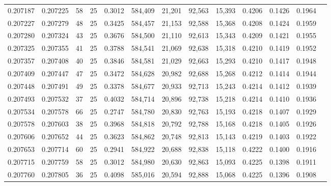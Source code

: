 \begin{tabular}{rrrrrrrrrrrrr}
0.207187 & 0.207225 &  58 &  25 &                                     0.3012 & 584,409 &  21,201 &  92,563 &  15,393 & 0.4206 & 0.1426 & 0.1964 \\
0.207227 & 0.207279 &  48 &  25 &                                     0.3425 & 584,457 &  21,153 &  92,588 &  15,368 & 0.4208 & 0.1424 & 0.1959 \\
0.207280 & 0.207324 &  43 &  25 &                                     0.3676 & 584,500 &  21,110 &  92,613 &  15,343 & 0.4209 & 0.1421 & 0.1955 \\
0.207325 & 0.207355 &  41 &  25 &                                     0.3788 & 584,541 &  21,069 &  92,638 &  15,318 & 0.4210 & 0.1419 & 0.1952 \\
0.207357 & 0.207408 &  40 &  25 &                                     0.3846 & 584,581 &  21,029 &  92,663 &  15,293 & 0.4210 & 0.1417 & 0.1948 \\
0.207409 & 0.207447 &  47 &  25 &                                     0.3472 & 584,628 &  20,982 &  92,688 &  15,268 & 0.4212 & 0.1414 & 0.1944 \\
0.207448 & 0.207491 &  49 &  25 &                                     0.3378 & 584,677 &  20,933 &  92,713 &  15,243 & 0.4214 & 0.1412 & 0.1939 \\
0.207493 & 0.207532 &  37 &  25 &                                     0.4032 & 584,714 &  20,896 &  92,738 &  15,218 & 0.4214 & 0.1410 & 0.1936 \\
0.207534 & 0.207578 &  66 &  25 &                                     0.2747 & 584,780 &  20,830 &  92,763 &  15,193 & 0.4218 & 0.1407 & 0.1929 \\
0.207578 & 0.207603 &  38 &  25 &                                     0.3968 & 584,818 &  20,792 &  92,788 &  15,168 & 0.4218 & 0.1405 & 0.1926 \\
0.207606 & 0.207652 &  44 &  25 &                                     0.3623 & 584,862 &  20,748 &  92,813 &  15,143 & 0.4219 & 0.1403 & 0.1922 \\
0.207653 & 0.207714 &  60 &  25 &                                     0.2941 & 584,922 &  20,688 &  92,838 &  15,118 & 0.4222 & 0.1400 & 0.1916 \\
0.207715 & 0.207759 &  58 &  25 &                                     0.3012 & 584,980 &  20,630 &  92,863 &  15,093 & 0.4225 & 0.1398 & 0.1911 \\
0.207760 & 0.207805 &  36 &  25 &                                     0.4098 & 585,016 &  20,594 &  92,888 &  15,068 & 0.4225 & 0.1396 & 0.1908 \\

\end{tabular}
